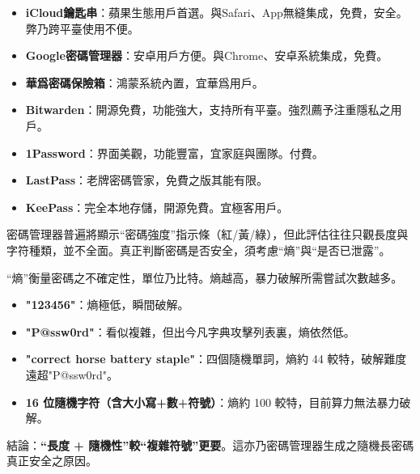 

\begin{itemize}
  \item \textbf{iCloud鑰匙串}：蘋果生態用戶首選。與Safari、App無縫集成，免費，安全。弊乃跨平臺使用不便。
  \item \textbf{Google密碼管理器}：安卓用戶方便。與Chrome、安卓系統集成，免費。
  \item \textbf{華爲密碼保險箱}：鴻蒙系統內置，宜華爲用戶。
\end{itemize}


\begin{itemize}
  \item \textbf{Bitwarden}：開源免費，功能強大，支持所有平臺。強烈薦予注重隱私之用戶。
  \item \textbf{1Password}：界面美觀，功能豐富，宜家庭與團隊。付費。
  \item \textbf{LastPass}：老牌密碼管家，免費之版其能有限。
  \item \textbf{KeePass}：完全本地存儲，開源免費。宜極客用戶。
\end{itemize}


密碼管理器普遍將顯示“密碼強度”指示條（紅/黃/綠），但此評估往往只觀長度與字符種類，並不全面。真正判斷密碼是否安全，須考慮“熵”與“是否已泄露”。


“熵”衡量密碼之不確定性，單位乃比特。熵越高，暴力破解所需嘗試次數越多。

\begin{itemize}
  \item \textbf{"123456"}：熵極低，瞬間破解。
  \item \textbf{"P@ssw0rd"}：看似複雜，但出今凡字典攻擊列表裏，熵依然低。
  \item \textbf{"correct horse battery staple"}：四個隨機單詞，熵約 44 較特，破解難度遠超"P@ssw0rd"。
  \item \textbf{16 位隨機字符（含大小寫+數+符號）}：熵約 100 較特，目前算力無法暴力破解。
\end{itemize}

結論：\textbf{“長度 + 隨機性”較“複雜符號”更要}。這亦乃密碼管理器生成之隨機長密碼真正安全之原因。


